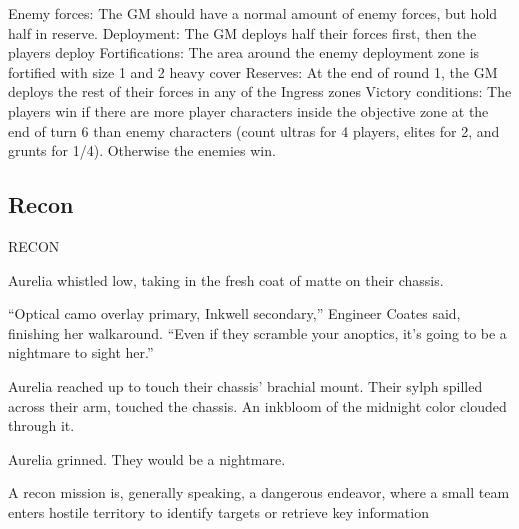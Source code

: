                                                              Enemy forces: The GM should have a
                                                             normal amount of enemy forces, but hold half
                                                             in reserve.
                                                             Deployment: The GM deploys half their
                                                            forces first, then the players deploy
                                                             Fortifications: The area around the enemy
                                                             deployment zone is fortified with size 1 and 2
                                                             heavy cover
                                                             Reserves: At the end of round 1, the GM
                                                             deploys the rest of their forces in any of the
                                                             Ingress zones
                                                            Victory conditions: The players win if there
                                                             are more player characters inside the
                                                             objective zone at the end of turn 6 than enemy
                                                            characters (count ultras for 4 players, elites for
2, and grunts for 1/4). Otherwise the enemies win.


\subsection{Recon}

RECON

         Aurelia whistled low, taking in the fresh coat of matte on their chassis.

          “Optical camo overlay primary, Inkwell secondary,” Engineer Coates said, finishing her walkaround.
          “Even if they scramble your anoptics, it’s going to be a nightmare to sight her.”

         Aurelia reached up to touch their chassis’ brachial mount. Their sylph spilled across their arm,
         touched the chassis. An inkbloom of the midnight color clouded through it.

         Aurelia grinned. They would be a nightmare.

A recon mission is, generally speaking, a dangerous endeavor, where a small team enters hostile
territory to identify targets or retrieve key information


